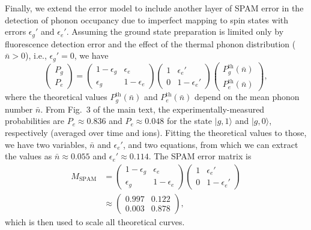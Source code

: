 \documentclass[groupaddress,9pt,twocolumn,superscriptaddress, aps, prl]{revtex4-1}
\newcommand{\ket}[1]{|#1\rangle}
\begin{document}
Finally, we extend the error model to include another layer of SPAM error in the detection of phonon occupancy due to imperfect mapping to spin states with errors $\epsilon_{g}'$ and $\epsilon_{e}'$. Assuming the ground state preparation is limited only by fluorescence detection error and the effect of the thermal phonon distribution ($\bar{n}>0$), i.e., $\epsilon_{g}' = 0$, we have
\begin{equation}
\left(\begin{array}{c}P_{g} \\P_{e}\end{array}\right) = 
\left(\begin{array}{cc}1-\epsilon_{g} & \epsilon_{e} \\ \epsilon_{g} & 1-\epsilon_{e}\end{array}\right)
\left(\begin{array}{cc}1 & \epsilon_{e}' \\0 & 1-\epsilon_{e}'\end{array}\right) 
\left(\begin{array}{c} P_{g}^{\text{th}}(\bar{n})  \\ P_{e}^{\text{th}}(\bar{n})  \end{array}\right), 
\end{equation}
where the theoretical values $P_{g}^{\text{th}}(\bar{n})$ and $P_{e}^{\text{th}}(\bar{n})$ depend on the mean phonon number $\bar{n}$. From Fig.\ 3 of the main text, the experimentally-measured probabilities are $P_{e} \approx 0.836$ and $P_{e} \approx 0.048$ for the state $\ket{g,1}$ and $\ket{g,0}$, respectively (averaged over time and ions). Fitting the theoretical values to those, we have two variables, $\bar{n}$ and  $\epsilon_{e}' $, and two equations, from which we can extract the values as $\bar{n} \approx 0.055$ and $\epsilon_{e}' \approx 0.114$. The SPAM error matrix is
\begin{equation}
\begin{split}
M_{\text{SPAM}} &= 
\left(\begin{array}{cc}1-\epsilon_{g} & \epsilon_{e} \\ \epsilon_{g} & 1-\epsilon_{e}\end{array}\right)
\left(\begin{array}{cc}1 & \epsilon_{e}' \\0 & 1-\epsilon_{e}'\end{array}\right) \\
&\approx \left(\begin{array}{cc}0.997 & 0.122 \\0.003 & 0.878 \end{array}\right),
\end{split}
\end{equation}
which is then used to scale all theoretical curves.
\\
\end{document}
